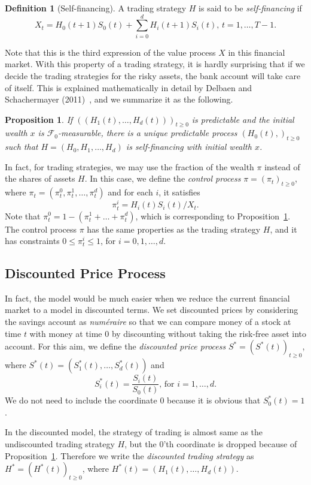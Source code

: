 \documentclass[a4paper]{article}
\newtheorem{proposition}[theorem]{Proposition}
\theoremstyle{definition}
\newtheorem{definition}[theorem]{Definition}
\numberwithin{equation}{section}
\begin{document}
\begin{definition}[Self-financing]
A trading strategy $H$ is said to be \emph{self-financing} if
$$X_t=H_0(t+1)S_0(t)+\sum^d_{i=0}H_i(t+1)S_i(t)\text{, }t=1,\dots,T-1.$$
\end{definition}
Note that this is the third expression of the value process $X$ in this financial market. With this property of a trading strategy, it is hardly surprising that if we decide the trading strategies for the risky assets, the bank account will take care of itself. This is explained mathematically in detail by Delbaen and Schachermayer (2011)~\cite{book1}, and we summarize it as the following.
\begin{proposition}\label{prop:H1}
If $((H_1(t),\dots,H_d(t)))_{t\geq0}$ is predictable and the initial wealth $x$ is $\mathcal F_0$-measurable, there is a unique predictable process $(H_0(t),)_{t\geq0}$ such that $H=(H_0,H_1,\dots,H_d)$ is self-financing with initial wealth $x$.
\end{proposition}

In fact, for trading strategies, we may use the fraction of the wealth $\pi$ instead of the shares of assets $H$. In this case, we define the \emph{control process} $\pi=(\pi_t)_{t\geq0}$, where $\pi_t=(\pi^0_t,\pi^1_t,\dots,\pi^d_t)$ and for each $i$, it satisfies
$$\pi^i_t=H_i(t)S_i(t)/X_t.$$
Note that $\pi^0_t=1-(\pi^1_t+\dots+\pi^d_t)$, which is corresponding to Proposition~\ref{prop:H1}. The control process $\pi$ has the same properties as the trading strategy $H$, and it has constraints $0\leq\pi^i_t\leq1$, for $i=0,1,\dots,d$.

\subsection{Discounted Price Process}
In fact, the model would be much easier when we reduce the current financial market to a model in discounted terms. We set discounted prices by considering the savings account as \emph{num\'eraire} so that we can compare money of a stock at time $t$ with money at time $0$ by discounting without taking the risk-free asset into account. For this aim, we define the \emph{discounted price process} $S^*=(S^*(t))_{t\geq0}$, where $S^*(t)=(S^*_1(t),\dots,S^*_d(t))$ and
$$S^*_i(t)=\frac{S_i(t)}{S_0(t)}\text{, for }i=1,\dots,d.$$
We do not need to include the coordinate $0$ because it is obvious that $S^*_0(t)=1$.

In the discounted model, the strategy of trading is almost same as the undiscounted trading strategy $H$, but the $0$'th coordinate is dropped because of Proposition~\ref{prop:H1}. Therefore we write the \emph{discounted trading strategy} as $H^*=(H^*(t))_{t\geq0}$, where $H^*(t)=(H_1(t),\dots,H_d(t))$.
\end{document}
